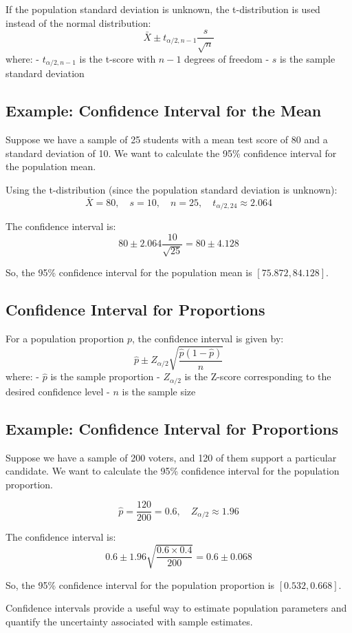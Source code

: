 \documentclass{article}
\begin{document}
If the population standard deviation is unknown, the t-distribution is used instead of the normal distribution:
\[
\bar{X} \pm t_{\alpha/2, n-1} \frac{s}{\sqrt{n}}
\]
where:
- \(t_{\alpha/2, n-1}\) is the t-score with \(n-1\) degrees of freedom
- \(s\) is the sample standard deviation

\subsection{Example: Confidence Interval for the Mean}
Suppose we have a sample of 25 students with a mean test score of 80 and a standard deviation of 10. We want to calculate the 95\% confidence interval for the population mean.

Using the t-distribution (since the population standard deviation is unknown):
\[
\bar{X} = 80, \quad s = 10, \quad n = 25, \quad t_{\alpha/2, 24} \approx 2.064
\]

The confidence interval is:
\[
80 \pm 2.064 \frac{10}{\sqrt{25}} = 80 \pm 4.128
\]

So, the 95\% confidence interval for the population mean is \([75.872, 84.128]\).

\subsection{Confidence Interval for Proportions}
For a population proportion \(p\), the confidence interval is given by:
\[
\hat{p} \pm Z_{\alpha/2} \sqrt{\frac{\hat{p}(1 - \hat{p})}{n}}
\]
where:
- \(\hat{p}\) is the sample proportion
- \(Z_{\alpha/2}\) is the Z-score corresponding to the desired confidence level
- \(n\) is the sample size

\subsection{Example: Confidence Interval for Proportions}
Suppose we have a sample of 200 voters, and 120 of them support a particular candidate. We want to calculate the 95\% confidence interval for the population proportion.

\[
\hat{p} = \frac{120}{200} = 0.6, \quad Z_{\alpha/2} \approx 1.96
\]

The confidence interval is:
\[
0.6 \pm 1.96 \sqrt{\frac{0.6 \times 0.4}{200}} = 0.6 \pm 0.068
\]

So, the 95\% confidence interval for the population proportion is \([0.532, 0.668]\).

Confidence intervals provide a useful way to estimate population parameters and quantify the uncertainty associated with sample estimates.
\end{document}
